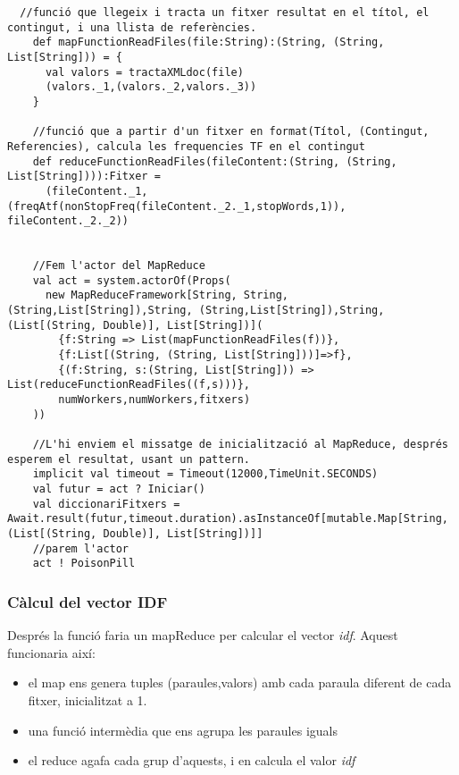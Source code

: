 \documentclass[11pt,a4paper,twoside]{report}
\begin{document}
\begin{lstlisting}
  //funció que llegeix i tracta un fitxer resultat en el títol, el contingut, i una llista de referències.
    def mapFunctionReadFiles(file:String):(String, (String, List[String])) = {
      val valors = tractaXMLdoc(file)
      (valors._1,(valors._2,valors._3))
    }

    //funció que a partir d'un fitxer en format(Títol, (Contingut, Referencies), calcula les frequencies TF en el contingut
    def reduceFunctionReadFiles(fileContent:(String, (String, List[String]))):Fitxer =
      (fileContent._1, (freqAtf(nonStopFreq(fileContent._2._1,stopWords,1)), fileContent._2._2))


    //Fem l'actor del MapReduce
    val act = system.actorOf(Props(
      new MapReduceFramework[String, String, (String,List[String]),String, (String,List[String]),String, (List[(String, Double)], List[String])](
        {f:String => List(mapFunctionReadFiles(f))},
        {f:List[(String, (String, List[String]))]=>f},
        {(f:String, s:(String, List[String])) => List(reduceFunctionReadFiles((f,s)))},
        numWorkers,numWorkers,fitxers)
    ))

    //L'hi enviem el missatge de inicialització al MapReduce, després esperem el resultat, usant un pattern.
    implicit val timeout = Timeout(12000,TimeUnit.SECONDS)
    val futur = act ? Iniciar()
    val diccionariFitxers = Await.result(futur,timeout.duration).asInstanceOf[mutable.Map[String, (List[(String, Double)], List[String])]]
    //parem l'actor
    act ! PoisonPill
\end{lstlisting}

\subsubsection{Càlcul del vector IDF}

Després la funció faria un mapReduce per calcular el vector \textit{idf}. Aquest funcionaria així:

\begin{itemize}
  \item el map ens genera tuples (paraules,valors) amb cada paraula diferent de cada fitxer, inicialitzat a 1.
  \item una funció intermèdia que ens agrupa les paraules iguals
  \item el reduce agafa cada grup d'aquests, i en calcula el valor \textit{idf}
\end{itemize}
\end{document}
